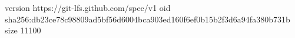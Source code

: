 version https://git-lfs.github.com/spec/v1
oid sha256:db23ce78c98809ad5bf56d6004bca903ed160f6ef0b15b2f3d6a94fa380b731b
size 11100
